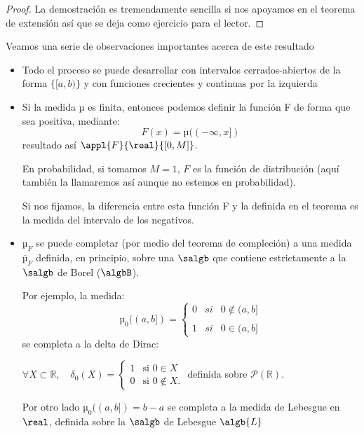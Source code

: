 \documentclass{apuntes}
\begin{document}
\begin{proof}
La demostración es tremendamente sencilla si nos apoyamos en el teorema de extensión así que se deja como ejercicio para el lector.

\end{proof}

Veamos una serie de observaciones importantes acerca de este resultado
\begin{obs}
\begin{itemize}
\item Todo el proceso se puede desarrollar con intervalos cerrados-abiertos de la forma $\{[a,b)\}$ y con funciones crecientes y continuas por la izquierda

\item Si la medida µ es finita, entonces podemos definir la función F de forma que sea positiva, mediante:
\[F(x)=µ((- \infty, x])\]
resultado así $\appl{F}{\real}{[0,M]}$.

En probabilidad, si tomamos $M=1$, $F$ es la función de distribución (aquí también la llamaremos así aunque no estemos en probabilidad). %

Si nos fijamos, la diferencia entre esta función F y la definida en el teorema es la medida del intervalo de los negativos.

\item $µ_F$ se puede completar (por medio del teorema de compleción) a una medida $\overline{µ}_F$ definida, en principio, sobre una $\salgb$ que contiene estrictamente a la $\salgb$ de Borel ($\algbB$).

Por ejemplo, la medida:
\[µ_0((a,b])= \left\{ \begin{array}{lcc}
            0 &   si  & 0 \notin (a,b] \\
             \\  1 &  si & 0 \in (a,b]
             \end{array}
   \right.\]
se completa a la delta de Dirac:

$\forall X \subset \mathbb{R}, \quad \delta_0(X) =
\begin{cases} 1 & \text{si } 0 \in X \\
0 & \text{si } 0 \notin X. \end{cases}$  definida sobre $\mathcal P \left({\mathbb{R}}\right)$. %

Por otro lado $µ_0((a,b])=b-a$ se completa a la medida de Lebesgue en $\real$, definida sobre la $\salgb$ de Lebesgue $\algb{L}$
\end{itemize}
\end{obs}
\end{document}
